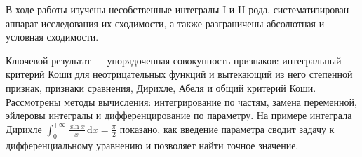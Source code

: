 \documentclass[coursework, och, times]{SCWorks1}
\newcommand{\dd}{\,\mathrm{d}}
\begin{document}


\conclusion
В ходе работы изучены несобственные интегралы I и II рода, систематизирован аппарат исследования их сходимости, а также разграничены абсолютная и условная сходимости. 

Ключевой результат — упорядоченная совокупность признаков: интегральный критерий Коши для неотрицательных функций и вытекающий из него степенной признак, признаки сравнения, Дирихле, Абеля и общий критерий Коши. Рассмотрены методы вычисления: интегрирование по частям, замена переменной, эйлеровы интегралы и дифференцирование по параметру. На примере интеграла Дирихле \(\int_0^{+\infty}\frac{\sin x}{x}\dd x=\frac{\pi}{2}\) показано, как введение параметра сводит задачу к дифференциальному уравнению и позволяет найти точное значение.
\end{document}
